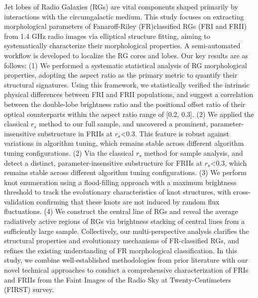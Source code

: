 \documentclass{aa}
\begin{document}
 \abstract
   {
   Jet lobes of Radio Galaxies (RGs) are vital components shaped primarily by interactions with the circumgalactic medium. This study focuses on extracting morphological parameters of Fanaroff-Riley (FR)\textemdash classified RGs (FRI and FRII) from 1.4 GHz radio images via elliptical structure fitting, aiming to systematically characterize their morphological properties. A semi-automated workflow is developed to localize the RG cores and lobes. 
    Our key results are as follows:
    (1) We performed a systematic statistical analysis of RG morphological properties, adopting the aspect ratio as the primary metric to quantify their structural signatures. Using this framework, we statistically verified the intrinsic physical differences between FRI and FRII populations, and suggest a correlation between the double-lobe brightness ratio and the positional offset ratio of their optical counterparts within the aspect ratio range of [0.2, 0.3].
    (2) We applied the classical $r_s$ method to our full sample, and uncovered a prominent, parameter-insensitive substructure in FRIIs at $r_s$<0.3. This feature is robust against variations in algorithm tuning, which remains stable across different algorithm tuning configurations.
    (2) Via the classical $r_s$ method for sample analysis, and detect a distinct, parameter-insensitive substructure for FRIIs at $r_s$<0.3, which remains stable across different algorithm tuning configurations.
    (3) We perform knot enumeration using a flood-filling approach with a maximum brightness threshold to track the evolutionary characteristics of knot structures, with cross-validation confirming that these knots are not induced by random flux fluctuations.
    (4) We construct the central line of RGs and reveal the average radiatively active regions of RGs via brightness stacking of central lines from a sufficiently large sample.
    Collectively, our multi-perspective analysis clarifies the structural properties and evolutionary mechanisms of FR-classified RGs, and refines the existing understanding of FR morphological classification. In this study, we combine well-established methodologies from prior literature with our novel technical approaches to conduct a comprehensive characterization of FRIs and FRIIs from the Faint Images of the Radio Sky at Twenty-Centimeters (FIRST) survey.

    
   }
 
  

\end{document}
